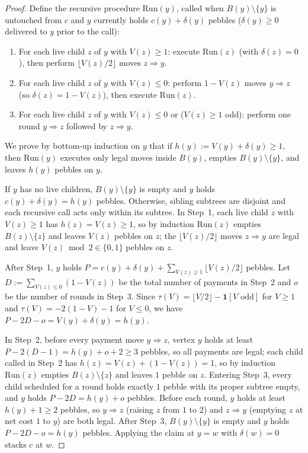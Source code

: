\documentclass[11pt]{article}
\begin{document}
\begin{proof}
Define the recursive procedure $\mathrm{Run}(y)$, called when $B(y) \setminus \{y\}$ is untouched from $c$ and $y$ currently holds $c(y) + \delta(y)$ pebbles ($\delta(y) \ge 0$ delivered to $y$ prior to the call):
\begin{enumerate}
  \item For each live child $z$ of $y$ with $V(z) \ge 1$: execute $\mathrm{Run}(z)$ (with $\delta(z) = 0$), then perform $\lfloor V(z)/2 \rfloor$ moves $z \Rightarrow y$.
  \item For each live child $z$ of $y$ with $V(z) \le 0$: perform $1 - V(z)$ moves $y \Rightarrow z$ (so $\delta(z) = 1 - V(z)$), then execute $\mathrm{Run}(z)$.
  \item For each live child $z$ of $y$ with $V(z) \le 0$ or ($V(z) \ge 1$ odd): perform one round $y \Rightarrow z$ followed by $z \Rightarrow y$.
\end{enumerate}
We prove by bottom-up induction on $y$ that if $h(y) := V(y) + \delta(y) \ge 1$, then $\mathrm{Run}(y)$ executes only legal moves inside $B(y)$, empties $B(y) \setminus \{y\}$, and leaves $h(y)$ pebbles on $y$.

If $y$ has no live children, $B(y) \setminus \{y\}$ is empty and $y$ holds $c(y) + \delta(y) = h(y)$ pebbles. Otherwise, sibling subtrees are disjoint and each recursive call acts only within its subtree. In Step~1, each live child $z$ with $V(z) \ge 1$ has $h(z) = V(z) \ge 1$, so by induction $\mathrm{Run}(z)$ empties $B(z) \setminus \{z\}$ and leaves $V(z)$ pebbles on $z$; the $\lfloor V(z)/2 \rfloor$ moves $z \Rightarrow y$ are legal and leave $V(z) \bmod 2 \in \{0,1\}$ pebbles on $z$.

After Step~1, $y$ holds $P = c(y) + \delta(y) + \sum_{V(z) \ge 1} \lfloor V(z)/2 \rfloor$ pebbles. Let $D := \sum_{V(z) \le 0} (1 - V(z))$ be the total number of payments in Step~2 and $o$ be the number of rounds in Step~3. Since $\tau(V) = \lfloor V/2 \rfloor - \mathbf{1}[V \text{ odd}]$ for $V \ge 1$ and $\tau(V) = -2(1-V) - 1$ for $V \le 0$, we have $P - 2D - o = V(y) + \delta(y) = h(y)$.

In Step~2, before every payment move $y \Rightarrow z$, vertex $y$ holds at least $P - 2(D-1) = h(y) + o + 2 \ge 3$ pebbles, so all payments are legal; each child called in Step~2 has $h(z) = V(z) + (1 - V(z)) = 1$, so by induction $\mathrm{Run}(z)$ empties $B(z) \setminus \{z\}$ and leaves $1$ pebble on $z$. Entering Step~3, every child scheduled for a round holds exactly $1$ pebble with its proper subtree empty, and $y$ holds $P - 2D = h(y) + o$ pebbles. Before each round, $y$ holds at least $h(y) + 1 \ge 2$ pebbles, so $y \Rightarrow z$ (raising $z$ from $1$ to $2$) and $z \Rightarrow y$ (emptying $z$ at net cost $1$ to $y$) are both legal. After Step~3, $B(y) \setminus \{y\}$ is empty and $y$ holds $P - 2D - o = h(y)$ pebbles. Applying the claim at $y = w$ with $\delta(w) = 0$ stacks $c$ at $w$.
\end{proof}
\end{document}
